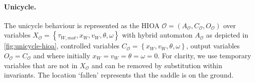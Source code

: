 \documentclass[copyright,submission]{eptcs}
\newcommand{\mi}[1]{\mathit{#1}}
\newcommand{\curly}[1]{\left\lbrace#1\right\rbrace}
\newcommand{\set}[1]{\curly{#1}}
\begin{document}
\begin{sloppypar}
\paragraph{Unicycle.}
The unicycle behaviour is represented as the HIOA
$\mathcal{O} = (A_\mathcal{O}, C_\mathcal{O}, O_\mathcal{O})$ over variables $X_\mathcal{O} = \set{\tau_{W, \mi{mot}}, x_W, v_W, \theta, \omega}$ with hybrid automaton \cite{DBLP:journals/tcs/AlurCHHHNOSY95} $A_\mathcal{O}$ as depicted in \cref{fig:unicycle-hioa}, controlled variables $C_\mathcal{O} = \set{x_W, v_W, \theta, \omega}$, output variables $O_\mathcal{O} = C_\mathcal{O}$ and where initially $x_W = v_W = \theta = \omega = 0$. For clarity, we use temporary variables that are not in $X_\mathcal{O}$ and can be removed by substitution within invariants. The location `fallen' represents that the saddle is on the ground.
\end{sloppypar}
\end{document}
